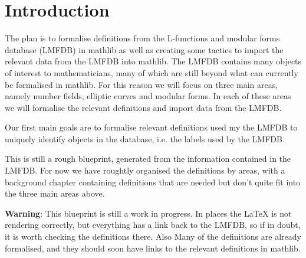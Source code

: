%

\tableofcontents

\chapter{Introduction}

The plan is to formalise definitions from the L-functions and modular forms database (LMFDB) in
mathlib as well as creating some tactics to import the relevant data from the LMFDB into mathlib.
The LMFDB contains many objects of interest to mathematicians, many of which are still beyond what can
currently be formalised in mathlib. For this reason we will focus on three main areas,
namely number fields, elliptic curves and modular forms. In each of these areas we will formalise
the relevant definitions and import data from the LMFDB.

Our first main goals are to formalise relevant definitions used my the LMFDB to uniquely identify
objects in the database, i.e. the labels used by the LMFDB.

This is still a rough blueprint, generated from the information contained in the LMFDB. For now we have
roughtly organised the definitions by areas, with a background chapter containing definitions that are
needed but don't quite fit into the three main areas above.

\textbf{Warning}: This blueprint is still a work in progress. In places the LaTeX is not rendering correctly, but everything has a link back to
the LMFDB, so if in doubt, it is worth checking the definitions there. Also Many of the definitions are already formalised, and they should soon
have links to the relevant definitions in mathlib.





